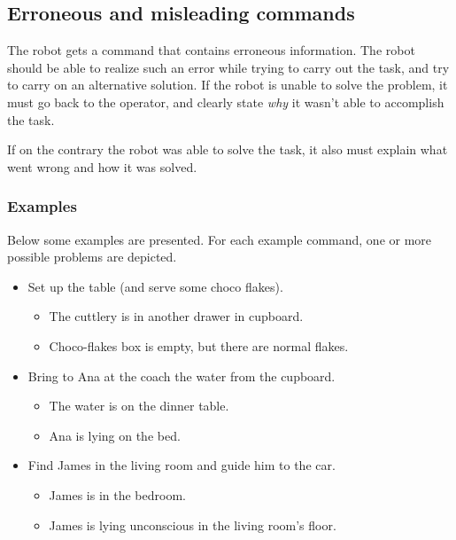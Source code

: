 %
%
\subsection{Erroneous and misleading commands}
\label{sec:eegpsr-erroneous-command}
The robot gets a command that contains erroneous information. The robot should be able to realize such an error while trying to carry out the task, and try to carry on an alternative solution. If the robot is unable to solve the problem, it must go back to the operator, and clearly state \textit{why} it wasn't able to accomplish the task.

If on the contrary the robot was able to solve the task, it also must explain what went wrong and how it was solved.

\subsubsection{Examples}
Below some examples are presented. For each example command, one or more possible problems are depicted.
\begin{itemize}
	\item Set up the table (and serve some choco flakes).
	\begin{itemize}
		\item The cuttlery is in another drawer in cupboard.
		\item Choco-flakes box is empty, but there are normal flakes.
	\end{itemize}

	\item Bring to Ana at the coach the water from the cupboard.
	\begin{itemize}
		\item The water is on the dinner table.
		\item Ana is lying on the bed.
	\end{itemize}

	\item Find James in the living room and guide him to the car.
	\begin{itemize}
		\item James is in the bedroom.
		\item James is lying unconscious in the living room's floor.
	\end{itemize}
\end{itemize}